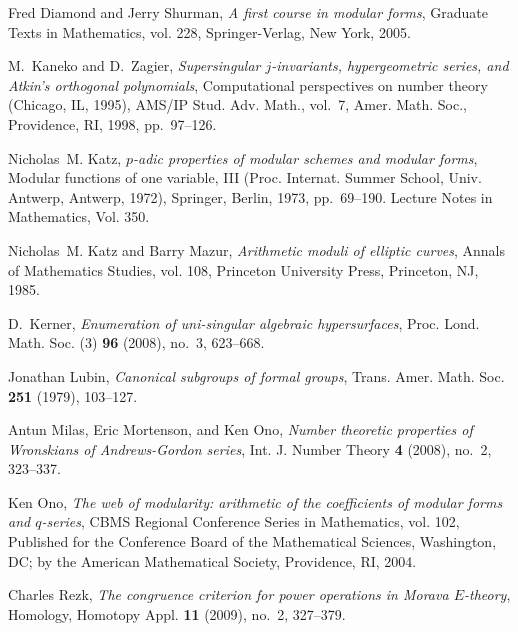 \documentclass{rs}
\theoremstyle{definition}
\theoremstyle{remark}
\renewcommand{\=}{\approx}
\renewcommand{\-}{\sim}
\numberwithin{equation}{section}
\begin{document}
\begin{thebibliography}
Fred Diamond and Jerry Shurman, \emph{A first course in modular forms},
  Graduate Texts in Mathematics, vol. 228, Springer-Verlag, New York, 2005.

M.~Kaneko and D.~Zagier, \emph{Supersingular {$j$}-invariants, hypergeometric
  series, and {A}tkin's orthogonal polynomials}, Computational perspectives on
  number theory ({C}hicago, {IL}, 1995), AMS/IP Stud. Adv. Math., vol.~7, Amer.
  Math. Soc., Providence, RI, 1998, pp.~97--126. 

Nicholas~M. Katz, \emph{{$p$}-adic properties of modular schemes and modular
  forms}, Modular functions of one variable, {III} ({P}roc. {I}nternat.
  {S}ummer {S}chool, {U}niv. {A}ntwerp, {A}ntwerp, 1972), Springer, Berlin,
  1973, pp.~69--190. Lecture Notes in Mathematics, Vol. 350. 

Nicholas~M. Katz and Barry Mazur, \emph{Arithmetic moduli of elliptic curves},
  Annals of Mathematics Studies, vol. 108, Princeton University Press,
  Princeton, NJ, 1985. 

D.~Kerner, \emph{Enumeration of uni-singular algebraic hypersurfaces}, Proc.
  Lond. Math. Soc. (3) \textbf{96} (2008), no.~3, 623--668. 

Jonathan Lubin, \emph{Canonical subgroups of formal groups}, Trans. Amer. Math.
  Soc. \textbf{251} (1979), 103--127. 

Antun Milas, Eric Mortenson, and Ken Ono, \emph{Number theoretic properties of
  {W}ronskians of {A}ndrews-{G}ordon series}, Int. J. Number Theory \textbf{4}
  (2008), no.~2, 323--337. 

Ken Ono, \emph{The web of modularity: arithmetic of the coefficients of modular
  forms and {$q$}-series}, CBMS Regional Conference Series in Mathematics, vol.
  102, Published for the Conference Board of the Mathematical Sciences,
  Washington, DC; by the American Mathematical Society, Providence, RI, 2004.

Charles Rezk, \emph{The congruence criterion for power operations in {M}orava
  {$E$}-theory}, Homology, Homotopy Appl. \textbf{11} (2009), no.~2, 327--379.


\end{thebibliography}
\end{document}
